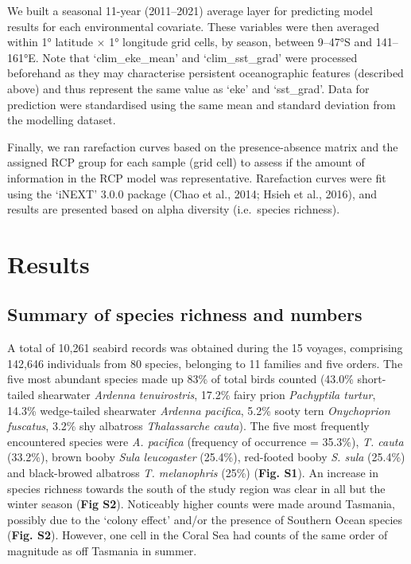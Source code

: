 \documentclass{article}
\begin{document}
We built a seasonal 11-year (2011--2021) average layer for predicting
model results for each environmental covariate. These variables were
then averaged within 1° latitude \(\times\) 1° longitude grid cells, by
season, between 9--47°S and 141--161°E. Note that `clim\_eke\_mean' and
`clim\_sst\_grad' were processed beforehand as they may characterise
persistent oceanographic features (described above) and thus represent
the same value as `eke' and `sst\_grad'. Data for prediction were
standardised using the same mean and standard deviation from the
modelling dataset.

Finally, we ran rarefaction curves based on the presence-absence matrix
and the assigned RCP group for each sample (grid cell) to assess if the
amount of information in the RCP model was representative. Rarefaction
curves were fit using the `iNEXT' 3.0.0 package (Chao et al., 2014;
Hsieh et al., 2016), and results are presented based on alpha diversity
(i.e.~species richness).

\hypertarget{results}{%
\section{Results}\label{results}}

\hypertarget{summary-of-species-richness-and-numbers}{%
\subsection{Summary of species richness and
numbers}\label{summary-of-species-richness-and-numbers}}

A total of 10,261 seabird records was obtained during the 15 voyages,
comprising 142,646 individuals from 80 species, belonging to 11 families
and five orders. The five most abundant species made up 83\% of total
birds counted (43.0\% short-tailed shearwater \emph{Ardenna
tenuirostris}, 17.2\% fairy prion \emph{Pachyptila turtur}, 14.3\%
wedge-tailed shearwater \emph{Ardenna pacifica}, 5.2\% sooty tern
\emph{Onychoprion fuscatus}, 3.2\% shy albatross \emph{Thalassarche
cauta}). The five most frequently encountered species were \emph{A.
pacifica} (frequency of occurrence = 35.3\%), \emph{T. cauta} (33.2\%),
brown booby \emph{Sula leucogaster} (25.4\%), red-footed booby \emph{S.
sula} (25.4\%) and black-browed albatross \emph{T. melanophris} (25\%)
(\textbf{Fig. S1}). An increase in species richness towards the south of
the study region was clear in all but the winter season (\textbf{Fig
S2}). Noticeably higher counts were made around Tasmania, possibly due
to the `colony effect' and/or the presence of Southern Ocean species
(\textbf{Fig. S2}). However, one cell in the Coral Sea had counts of the
same order of magnitude as off Tasmania in summer.
\end{document}
